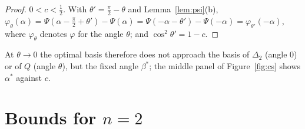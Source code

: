 \documentclass[11pt]{article}
\theoremstyle{plain}
\theoremstyle{definition}
\theoremstyle{remark}
\begin{document}
\begin{proof}
\emph{$0<c<\frac12$.} With $\theta'=\frac\pi2-\theta$ and Lemma~\ref{lem:psi}(b),
$\varphi_\theta(\alpha)=\Psi(\alpha-\frac\pi2+\theta')-\Psi(\alpha)=\Psi(-\alpha-\theta')-\Psi(-\alpha)=\varphi_{\theta'}(-\alpha)$,
where $\varphi_\theta$ denotes $\varphi$ for the angle $\theta$; and $\cos^2\theta'=1-c$.
\end{proof}

\noindent At $\theta\to0$ the optimal basis therefore does not approach the basis of $\Delta_2$ (angle $0$) or of $Q$ (angle
$\theta$), but the fixed angle $\beta^*$; the middle panel of Figure~\ref{fig:cs} shows $\alpha^*$ against $c$.

\section{Bounds for \texorpdfstring{$n=2$}{n=2}}\label{sec:bounds}
\end{document}
